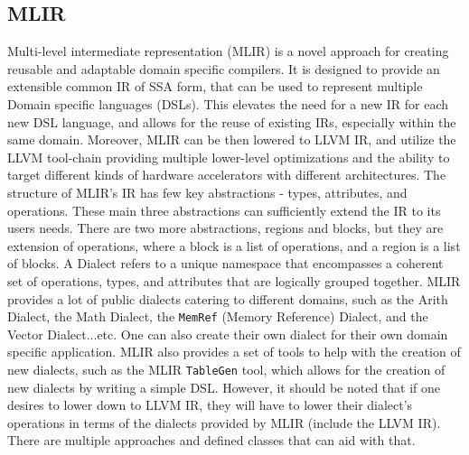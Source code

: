 \subsection{MLIR}
Multi-level intermediate representation (MLIR) is a novel approach for creating
reusable and adaptable domain specific compilers. It is designed to provide an
extensible common IR of SSA form, that can be used to represent multiple Domain
specific languages (DSLs). This elevates the need for a new IR for each new DSL
language, and allows for the reuse of existing IRs, especially within the same
domain. Moreover, MLIR can be then lowered to LLVM IR, and utilize the LLVM
tool-chain providing multiple lower-level optimizations and the ability to target
different kinds of hardware accelerators with different architectures. The
structure of MLIR's IR has few key abstractions - types, attributes, and
operations. These main three abstractions can sufficiently extend the IR to its
users needs. There are two more abstractions, regions and blocks, but they are
extension of operations, where a block is a list of operations, and a region is
a list of blocks. A Dialect refers to a unique namespace that encompasses a
coherent set of operations, types, and attributes that are logically grouped
together. MLIR provides a lot of public dialects catering to different domains,
such as the Arith Dialect, the Math Dialect, the \texttt{MemRef} (Memory Reference) Dialect,
and the Vector Dialect...etc. One can also create their own dialect 
for their own domain specific application. MLIR also provides a set of tools to
help with the creation of new dialects, such as the MLIR \texttt{TableGen} tool, which
allows for the creation of new dialects by writing a simple DSL.
However, it should be noted that if one desires to lower down to LLVM IR, they
will have to lower their dialect's operations in terms of the dialects provided 
by MLIR (include the LLVM IR). There are multiple approaches and defined classes that can aid with that.

